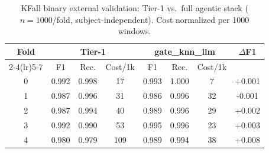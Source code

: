 \begin{table}[!t]
\centering
\caption{KFall binary external validation: Tier-1 vs.\ full agentic stack ($n{=}1000$/fold, subject-independent). Cost normalized per 1000 windows.}
\label{tab:kfallperfold}
\begin{tabular}{c ccc ccc c}
\toprule
Fold & \multicolumn{3}{c}{Tier-1} & \multicolumn{3}{c}{gate\_knn\_llm} & $\Delta$F1 \\
\cmidrule(lr){2-4}\cmidrule(lr){5-7}
 & F1 & Rec. & Cost/1k & F1 & Rec. & Cost/1k & \\
\midrule
0 & 0.992 & 0.998 & 17 & 0.993 & 1.000 & 7 & +0.001 \\
1 & 0.987 & 0.996 & 31 & 0.986 & 0.996 & 32 & -0.001 \\
2 & 0.987 & 0.994 & 40 & 0.989 & 0.996 & 29 & +0.002 \\
3 & 0.992 & 0.990 & 53 & 0.995 & 0.996 & 23 & +0.003 \\
4 & 0.980 & 0.979 & 109 & 0.989 & 0.994 & 38 & +0.008 \\
\bottomrule
\end{tabular}
\end{table}
